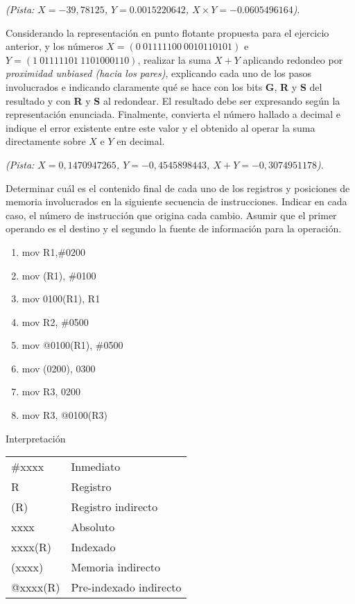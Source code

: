 \documentclass[12pt,a4paper]{article}
\begin{document}
\textit{(Pista: $X=-39,78125$, $Y= 0.0015220642$, $X \times Y = -0.0605496164$)}.

 Considerando la representación en punto flotante propuesta para el ejercicio anterior, y los números $X = (0 \ 01111100 \ 0010110101)$ e $Y = (1 \ 01111101 \ 1101000110)$, realizar la suma $X + Y$ aplicando redondeo por \textit{proximidad unbiased (hacia los pares)}, explicando cada uno de los pasos involucrados e indicando claramente qué se hace con los bits \textbf{G}, \textbf{R} y \textbf{S} del resultado y con \textbf{R} y \textbf{S} al redondear. El resultado debe ser expresando según la representación enunciada. Finalmente, convierta el número hallado a decimal e indique el error existente entre este valor y el obtenido al operar la suma directamente sobre $X$ e $Y$ en decimal. 

\textit{(Pista: $X=0,1470947265$, $Y=-0,4545898443$, $X+Y =-0,3074951178$)}.

 Determinar cuál es el contenido final de cada uno de los registros y posiciones de memoria involucrados en la siguiente secuencia de instrucciones. Indicar en cada caso, el número de instrucción que origina cada cambio. Asumir que el primer operando es el destino y el segundo la fuente de información para la operación.
\begin{center}
	\begin{minipage}{0.4\textwidth}
		\begin{enumerate}[(1)]
			\itemsep -5pt
			\item mov R1,\#0200
			\item mov (R1), \#0100
			\item mov 0100(R1), R1
			\item mov R2, \#0500
			\item mov @0100(R1), \#0500
			\item mov (0200), 0300
			\item mov R3, 0200
			\item mov R3, @0100(R3)
		\end{enumerate}
	\end{minipage}
	\begin{minipage}{0.4\textwidth}
		Interpretación
		\begin{tabular}{ll}
			\#xxxx   & Inmediato\\
			R       & Registro \\
			(R)     & Registro indirecto\\
			xxxx    & Absoluto \\
			xxxx(R) & Indexado \\
			(xxxx)  & Memoria indirecto\\
			@xxxx(R) & Pre-indexado indirecto
		\end{tabular}
	\end{minipage}
\end{center}
\end{document}
